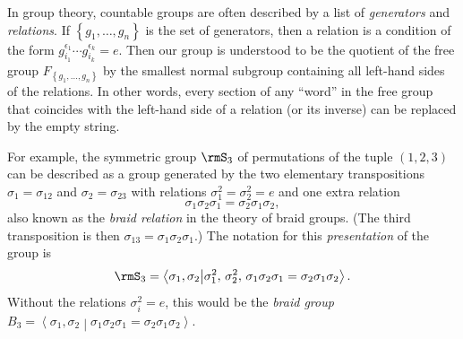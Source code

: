 \begin{rem}
In group theory, countable groups are often described
by a list of \emph{generators} and \emph{relations}. If $\left\{ g_{1},\ldots,g_{n}\right\} $
is the set of generators, then a relation is a condition of the form
$g_{i_{1}}^{\epsilon_{1}}\cdots g_{i_{k}}^{\epsilon_{k}}=e$. Then
our group is understood to be the quotient of the free group $F_{\left\{ g_1,\ldots,g_n\right\} }$
by the smallest normal subgroup containing all left-hand sides of the
relations. In other words, every section of any ``word'' in the
free group that coincides with the left-hand side of a relation (or
its inverse) can be replaced by the empty string.

For example, the symmetric group $\rmS_{3}$ of permutations of the tuple $(1,2,3)$
can be described as a group generated by the two elementary transpositions
$\sigma_{1}=\sigma_{12}$ and $\sigma_{2}=\sigma_{23}$ with relations
$\sigma_{1}^{2}=\sigma_{2}^{2}=e$ and one extra relation
\[\sigma_{1}\sigma_{2}\sigma_{1}=\sigma_{2}\sigma_{1}\sigma_{2},\]
also known as the \emph{braid relation} in the theory of braid groups.
(The third transposition is then $\sigma_{13}=\sigma_{1}\sigma_{2}\sigma_{1}$.)
The notation for this \emph{presentation} of the group is 
\begin{equation}
\rmS_{3}=\left\langle \sigma_{1},\sigma_{2}\middle|\sigma_{1}^{2},\,\sigma_{2}^{2},\,\sigma_{1}\sigma_{2}\sigma_{1}=\sigma_{2}\sigma_{1}\sigma_{2}\right\rangle .
\end{equation}
Without the relations $\sigma_{i}^{2}=e$, this would
be the \emph{braid group} $B_{3}=\left\langle \sigma_{1},\sigma_{2}\middle|\sigma_{1}\sigma_{2}\sigma_{1}=\sigma_{2}\sigma_{1}\sigma_{2}\right\rangle$.
\end{rem}
%
